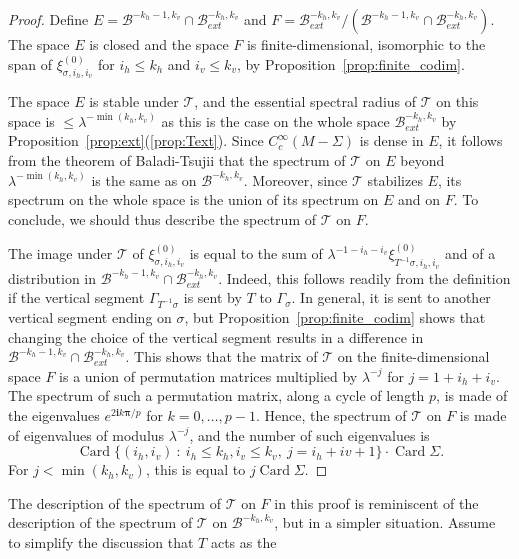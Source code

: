 \documentclass[11pt, a4paper, oneside, final, pagebackref]{amsart}
\newcommand{\boB}{\mathcal{B}}
\newcommand{\boT}{\mathcal{T}}
\newcommand{\ic}{\mathbf{i}}
\newcommand{\bpi}{\boldsymbol{\pi}}
\newcommand{\st}{\::\:}
\DeclareMathOperator{\Card}{Card}
\renewcommand{\leq}{\leqslant}
\theoremstyle{definition}
\numberwithin{equation}{section}
\begin{document}
\begin{proof}
Define $E = \boB^{-k_h-1, k_v} \cap \boB^{-k_h, k_v}_{ext}$ and $F =
\boB_{ext}^{-k_h, k_v}/(\boB^{-k_h-1, k_v} \cap \boB^{-k_h, k_v}_{ext})$. The
space $E$ is closed and the space $F$ is finite-dimensional, isomorphic to
the span of $\xi^{(0)}_{\sigma, i_h, i_v}$ for $i_h \leq k_h$ and $i_v\leq
k_v$, by Proposition~\ref{prop:finite_codim}.

The space $E$ is stable under $\boT$, and the essential spectral radius of
$\boT$ on this space is $\leq \lambda^{-\min(k_h, k_v)}$ as this is the case
on the whole space $\boB_{ext}^{-k_h, k_v}$ by
Proposition~\ref{prop:ext}(\ref{prop:Text}). Since $C^\infty_c(M-\Sigma)$ is
dense in $E$, it follows from the theorem of Baladi-Tsujii that the spectrum
of $\boT$ on $E$ beyond $\lambda^{-\min(k_h, k_v)}$ is the same as on
$\boB^{-k_h, k_v}$. Moreover, since $\boT$ stabilizes $E$, its spectrum on
the whole space is the union of its spectrum on $E$ and on $F$. To conclude,
we should thus describe the spectrum of $\boT$ on $F$.

The image under $\boT$ of $\xi^{(0)}_{\sigma, i_h, i_v}$ is equal to the sum
of $\lambda^{-1-i_h-i_v} \xi^{(0)}_{T^{-1}\sigma, i_h, i_v}$ and of a
distribution in $\boB^{-k_h-1, k_v} \cap \boB^{-k_h, k_v}_{ext}$. Indeed,
this follows readily from the definition if the vertical segment
$\Gamma_{T^{-1}\sigma}$ is sent by $T$ to $\Gamma_\sigma$. In general, it is
sent to another vertical segment ending on $\sigma$, but
Proposition~\ref{prop:finite_codim} shows that changing the choice of the
vertical segment results in a difference in $\boB^{-k_h-1, k_v} \cap
\boB_{ext}^{-k_h, k_v}$. This shows that the matrix of $\boT$ on the
finite-dimensional space $F$ is a union of permutation matrices multiplied by
$\lambda^{-j}$ for $j=1+i_h+i_v$. The spectrum of such a permutation matrix,
along a cycle of length $p$, is made of the eigenvalues $e^{2\ic k\bpi/p}$
for $k=0,\dotsc, p-1$. Hence, the spectrum of $\boT$ on $F$ is made of
eigenvalues of modulus $\lambda^{-j}$, and the number of such eigenvalues is
\begin{equation*}
   \Card \{(i_h, i_v) \st i_h \leq k_h, i_v \leq k_v, \ j = i_h+iv+1\} \cdot \Card\Sigma.
\end{equation*}
For $j < \min(k_h, k_v)$, this is equal to $j \Card \Sigma$.
\end{proof}
The description of the spectrum of $\boT$ on $F$ in this proof is reminiscent
of the description of the spectrum of $\boT$ on $\boB^{-k_h, k_v}$, but in a
simpler situation. Assume to simplify the discussion that $T$ acts as the
\end{document}
